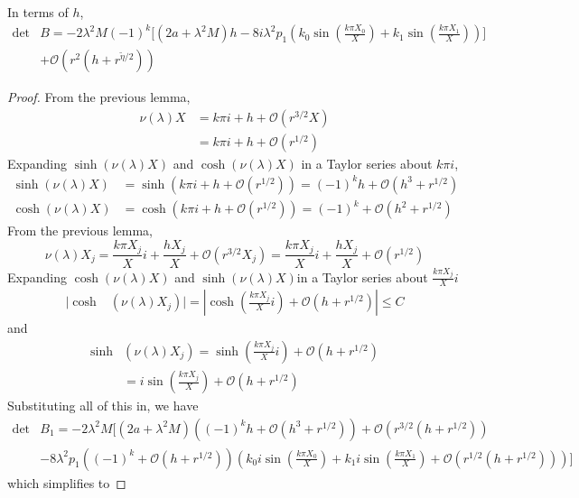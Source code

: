 \documentclass[thesis.tex]{subfiles}
\begin{document}
\begin{lemma}
In terms of $h$,
\begin{align*}
\det &B = -2 \lambda^2 M (-1)^k \Big[ (2a + \lambda^2 M) h - 8 i \lambda^2 p_1 \left( k_0 \sin\left(\frac{k \pi X_0}{X}\right) + k_1 \sin\left(\frac{k \pi X_1}{X}\right) \right) \Big] \\
&+ \mathcal{O}(r^2(h + r^{\tilde{\eta}/2}))
\end{align*}
\begin{proof}
From the previous lemma,
\begin{align*}
\nu(\lambda) X &= k \pi i + h + \mathcal{O}(r^{3/2}X) \\
&= k \pi i + h + \mathcal{O}(r^{1/2})
\end{align*}
Expanding $\sinh(\nu(\lambda)X)$ and $\cosh(\nu(\lambda)X)$ in a Taylor series about $k \pi i$,
\begin{align*}
\sinh(\nu(\lambda)X) &= \sinh(k \pi i + h + \mathcal{O}(r^{1/2})) = (-1)^k h  + \mathcal{O}(h^3 + r^{1/2}) \\
\cosh(\nu(\lambda)X) &= \cosh(k \pi i + h + \mathcal{O}(r^{1/2})) = (-1)^k +  \mathcal{O}(h^2 + r^{1/2})
\end{align*}
From the previous lemma,
\[
\nu(\lambda)X_j = \frac{k \pi X_j}{X}i + \frac{h X_j}{X} + \mathcal{O}(r^{3/2} X_j)
= \frac{k \pi X_j}{X}i + \frac{h X_j}{X} + \mathcal{O}(r^{1/2})
\]
Expanding $\cosh(\nu(\lambda)X)$ and $\sinh(\nu(\lambda)X)$in a Taylor series about $\frac{k \pi X_j}{X}i$
\begin{align*}
|\cosh&(\nu(\lambda)X_j)| = \left| 
\cosh\left( \frac{k \pi X_j}{X}i \right) + \mathcal{O}(h + r^{1/2}) \right| \leq C
\end{align*}
and
\begin{align*}
\sinh&(\nu(\lambda)X_j)
= \sinh\left( \frac{k \pi X_j}{X}i \right) + \mathcal{O}(h + r^{1/2}) \\
&= i \sin\left( \frac{k \pi X_j}{X}\right) + \mathcal{O}(h + r^{1/2})
\end{align*}
Substituting all of this in, we have
\begin{align*}
\det &B_1 = -2 \lambda^2 M \Big[ (2a + \lambda^2 M)((-1)^k h + \mathcal{O}(h^3 + r^{1/2})) + \mathcal{O}(r^{3/2}(h + r^{1/2})) \\
&- 8 \lambda^2 p_1 ((-1)^k + \mathcal{O}(h + r^{1/2})) \left( k_0 i \sin\left(\frac{k \pi X_0}{X}\right) 
+ k_1 i \sin\left(\frac{k \pi X_1}{X}\right) + \mathcal{O}(r^{1/2}(h + r^{1/2})) \right) \Big] 
\end{align*}
which simplifies to

\end{proof}
\end{lemma}
\end{document}
